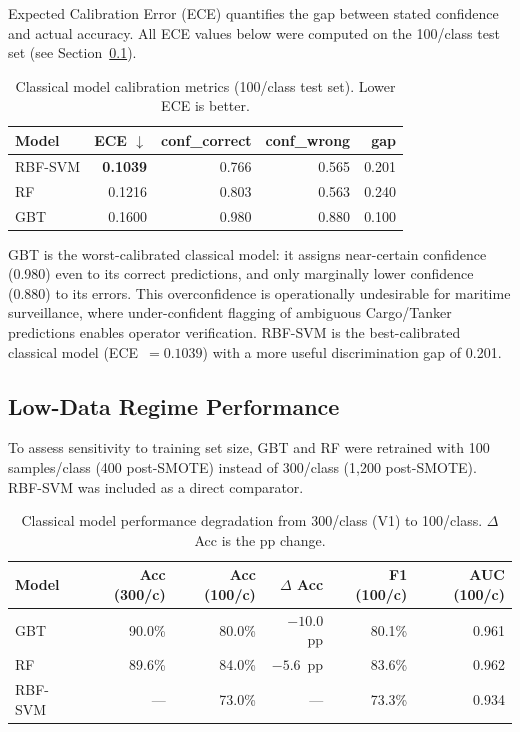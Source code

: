 \documentclass[journal]{IEEEtran}
\begin{document}
Expected Calibration Error (ECE) quantifies the gap between stated confidence
and actual accuracy. All ECE values below were computed on the 100/class test
set (see Section~\ref{sec:lowdata}).

\begin{table}[H]
\centering
\caption{Classical model calibration metrics (100/class test set).
         Lower ECE is better.}
\begin{tabular}{lrrrr}
\toprule
\textbf{Model} & \textbf{ECE} $\downarrow$ & \textbf{conf\_correct} & \textbf{conf\_wrong} & \textbf{gap} \\
\midrule
RBF-SVM & \textbf{0.1039} & 0.766 & 0.565 & 0.201 \\
RF      & 0.1216          & 0.803 & 0.563 & 0.240 \\
GBT     & 0.1600          & 0.980 & 0.880 & 0.100 \\
\bottomrule
\end{tabular}
\end{table}

\noindent GBT is the worst-calibrated classical model: it assigns near-certain
confidence (0.980) even to its correct predictions, and only marginally lower
confidence (0.880) to its errors. This overconfidence is operationally
undesirable for maritime surveillance, where under-confident flagging of
ambiguous Cargo/Tanker predictions enables operator verification. RBF-SVM
is the best-calibrated classical model (ECE~$= 0.1039$) with a more useful
discrimination gap of 0.201.

\subsection{Low-Data Regime Performance}
\label{sec:lowdata}

To assess sensitivity to training set size, GBT and RF were retrained with
100 samples/class (400 post-SMOTE) instead of 300/class (1,200 post-SMOTE).
RBF-SVM was included as a direct comparator.

\begin{table}[H]
\centering
\caption{Classical model performance degradation from 300/class (V1) to 100/class.
         $\Delta$ Acc is the pp change.}
\begin{tabular}{lrrrrr}
\toprule
\textbf{Model} & \textbf{Acc (300/c)} & \textbf{Acc (100/c)} & \textbf{$\Delta$ Acc}
               & \textbf{F1 (100/c)} & \textbf{AUC (100/c)} \\
\midrule
GBT     & 90.0\% & 80.0\% & $-10.0$~pp & 80.1\% & 0.961 \\
RF      & 89.6\% & 84.0\% & $-5.6$~pp  & 83.6\% & 0.962 \\
RBF-SVM & —      & 73.0\% & —          & 73.3\% & 0.934 \\
\bottomrule
\end{tabular}
\end{table}
\end{document}
